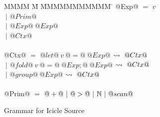 
\begin{figure}

\begin{tabbing}
MMMM \= M \= MMMMMMMMMMM \= \kill
@Exp@
    \> $=$  \> $v$ \\
    \> $~|$ \> $@Prim@$ \\
    \> $~|$ \> $@Exp@~@Exp@$ \\
    \> $~|$ \> $@Ctx@$ \\
\\
@Ctx@
    \> $=$  \> $@let@~v~@=@~@Exp@$
            \> $\leadsto~@Ctx@$ \\
    \> $~|$ \> $@fold@~v~@=@~@Exp;@~@Exp@$
            \> $\leadsto~@Ctx@$ \\

    \> $~|$ \> $@group@~@Exp@$
            \> $\leadsto~@Ctx@$ \\
\\
@Prim@
    \> $=$  \> $@+@~|~@>@~|~\mathbb{N}~|~@scan@$ \\
\end{tabbing}


\caption{Grammar for Icicle Source}
\label{fig:source:grammar}
\end{figure}

